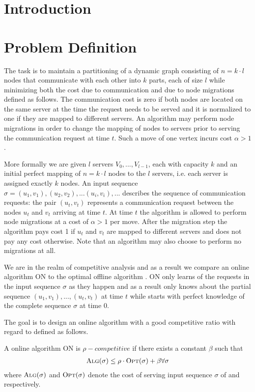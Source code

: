 \documentclass[a4paper,xcolor=dvipsnames, tikz, 12pt]{article}
\newcommand{\opt}{\text{O{\scriptsize PT}}}
\newcommand{\alg}{\text{A{\scriptsize LG}}}
\theoremstyle{definition}
\begin{document}
{
	\hypersetup{linkcolor=black}
	\tableofcontents
	\clearpage
}


\section{Introduction}
	
	
	\section{Problem Definition}
	The task is to maintain a partitioning of a dynamic graph consisting of $n=k\cdot l$ nodes that communicate with each other into $k$ parts, each of size $l$ while minimizing both the cost due to communication and due to node migrations defined as follows. The communication cost is zero if both nodes are located on the same server at the time the request needs to be served and it is normalized to one if they are mapped to different servers. An algorithm may perform node migrations in order to change the mapping of nodes to servers prior to serving the communication request at time $t$. Such a move of one vertex incurs cost $\alpha>1$.
	
	More formally we are given $l$ servers $V_0,...,V_{l-1}$, each with capacity $k$ and an initial perfect mapping of $n=k\cdot l$ nodes to the $l$ servers, i.e. each server is assigned exactly $k$ nodes. An input sequence $\sigma=(u_1, v_1), (u_2, v_2),...(u_i,v_i),...$ describes the sequence of communication requests: the pair $(u_t, v_t)$ represents a communication request between the nodes $u_t$ and $v_t$ arriving at time $t$. At time $t$ the algorithm is allowed to perform node migrations at a cost of $\alpha>1$ per move. After the migration step the algorithm pays cost 1 if $u_t$ and $v_t$ are mapped to different servers and does not pay any cost otherwise. Note that an algorithm may also choose to perform no migrations at all.
	
	We are in the realm of competitive analysis and as a result we compare an online algorithm ON to the optimal offline algorithm \opt{}. ON only learns of the requests in the input sequence $\sigma$ as they happen and as a result only knows about the partial sequence $(u_1,v_1),...,(u_t,v_t)$ at time $t$ while \opt{} starts with perfect knowledge of the complete sequence $\sigma$ at time $0$.
	
	The goal is to design an online algorithm \alg{} with a good competitive ratio with regard to \opt{} defined as follows.
	
	A online algorithm ON is $\rho-competitive$ if there exists a constant $\beta$ such that \begin{align*}
	\alg{}(\sigma)\leq\rho\cdot \opt{}(\sigma)+\beta\forall \sigma
	\end{align*} 
	where $\alg{}(\sigma)$ and $\opt{}(\sigma)$ denote the cost of serving input sequence $\sigma$ of \alg{} and \opt{} respectively.
	
\end{document}
